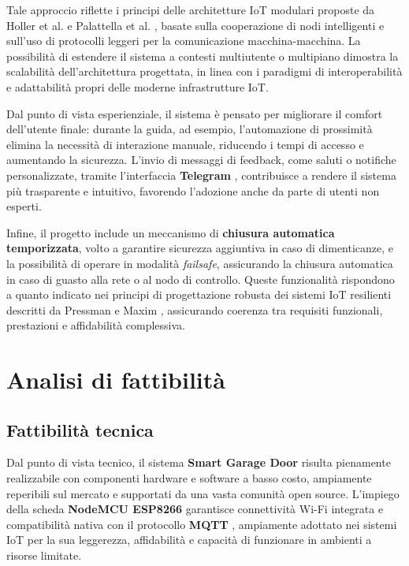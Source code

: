 Tale approccio riflette i principi delle architetture IoT modulari proposte da Holler et al. \cite{Holler2014} e Palattella et al. \cite{Palattella2016}, basate sulla cooperazione di nodi intelligenti e sull’uso di protocolli leggeri per la comunicazione macchina-macchina.  
La possibilità di estendere il sistema a contesti multiutente o multipiano dimostra la scalabilità dell’architettura progettata, in linea con i paradigmi di interoperabilità e adattabilità propri delle moderne infrastrutture IoT.

Dal punto di vista esperienziale, il sistema è pensato per migliorare il comfort dell’utente finale: durante la guida, ad esempio, l’automazione di prossimità elimina la necessità di interazione manuale, riducendo i tempi di accesso e aumentando la sicurezza.  
L’invio di messaggi di feedback, come saluti o notifiche personalizzate, tramite l’interfaccia \textbf{Telegram} \cite{TelegramAPI}, contribuisce a rendere il sistema più trasparente e intuitivo, favorendo l’adozione anche da parte di utenti non esperti.

Infine, il progetto include un meccanismo di \textbf{chiusura automatica temporizzata}, volto a garantire sicurezza aggiuntiva in caso di dimenticanze, e la possibilità di operare in modalità \textit{failsafe}, assicurando la chiusura automatica in caso di guasto alla rete o al nodo di controllo.  
Queste funzionalità rispondono a quanto indicato nei principi di progettazione robusta dei sistemi IoT resilienti descritti da Pressman e Maxim \cite{Pressman2019}, assicurando coerenza tra requisiti funzionali, prestazioni e affidabilità complessiva.

\section{Analisi di fattibilità}

\subsection{Fattibilità tecnica}
Dal punto di vista tecnico, il sistema \textbf{Smart Garage Door} risulta pienamente realizzabile con componenti hardware e software a basso costo, ampiamente reperibili sul mercato e supportati da una vasta comunità open source.  
L’impiego della scheda \textbf{NodeMCU ESP8266} \cite{ESP8266} garantisce connettività Wi-Fi integrata e compatibilità nativa con il protocollo \textbf{MQTT} \cite{MQTTspec}, ampiamente adottato nei sistemi IoT per la sua leggerezza, affidabilità e capacità di funzionare in ambienti a risorse limitate.  

